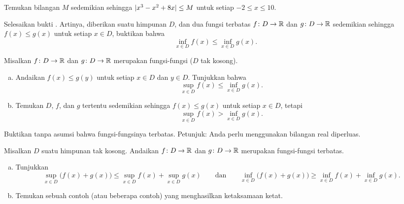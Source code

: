 \begin{exercise}
Temukan bilangan $M$ sedemikian sehingga $\lvert {x^3-x^2+8x} \rvert \leq M$ untuk setiap $-2 \leq x \leq
10$.
\end{exercise}

\begin{exercise} \label{exercise:finishfuncsupinf}
Selesaikan bukti .
Artinya,
diberikan suatu himpunan $D$,
dan dua fungsi terbatas
$f \colon D \to {\mathbb{R}}$ dan $g \colon D \to {\mathbb{R}}$
sedemikian sehingga $f(x) \leq g(x)$ untuk setiap $x \in D$, buktikan bahwa
\begin{equation*}
\inf_{x\in D} f(x) \leq \inf_{x\in D} g(x) .
\end{equation*}
\end{exercise}

\begin{exercise} \label{exercise:supinffuncineq}
Misalkan
$f \colon D \to {\mathbb{R}}$ dan $g \colon D \to {\mathbb{R}}$ merupakan fungsi-fungsi ($D$ tak kosong).
\begin{enumerate}[a)]
%
\item
Andaikan
$f(x) \leq g(y)$ untuk setiap $x \in D$ dan $y \in D$.  Tunjukkan bahwa
\begin{equation*}
\sup_{x\in D} f(x) \leq \inf_{x\in D} g(x) .
\end{equation*}
%
\item
Temukan $D$, $f$, dan $g$ tertentu sedemikian sehingga
$f(x) \leq g(x)$ untuk setiap $x \in D$, tetapi
\begin{equation*}
\sup_{x\in D} f(x) > \inf_{x\in D} g(x) .
\end{equation*}
\end{enumerate}
\end{exercise}

\begin{exercise}
Buktikan  tanpa asumsi bahwa
fungsi-fungsinya terbatas.  Petunjuk: Anda perlu menggunakan bilangan
real diperluas.
\end{exercise}

\begin{exercise} \label{exercise:sumofsup}
\pagebreak[2]
Misalkan $D$ suatu himpunan tak kosong.
Andaikan $f \colon D \to {\mathbb{R}}$ dan $g \colon D \to {\mathbb{R}}$ merupakan fungsi-fungsi terbatas.
\begin{enumerate}[a)]
\item
Tunjukkan
\begin{equation*}
\sup_{x\in D} \bigl(f(x) + g(x) \bigr) \leq
\sup_{x\in D} f(x)
+
\sup_{x\in D} g(x)
\qquad \text{dan}
\qquad
\inf_{x\in D} \bigl(f(x) + g(x) \bigr) \geq
\inf_{x\in D} f(x)
+
\inf_{x\in D} g(x) .
\end{equation*}
\item
Temukan sebuah contoh (atau beberapa contoh) yang menghasilkan ketaksamaan ketat.
\end{enumerate}
\end{exercise}

